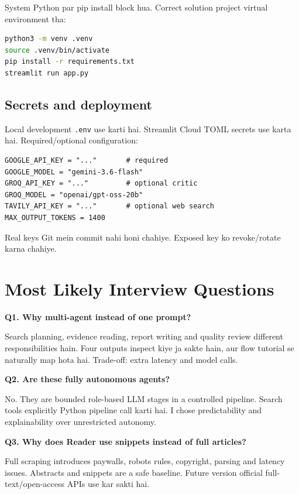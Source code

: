 \documentclass[11pt,a4paper]{article}
\newcommand{\code}[1]{\texttt{#1}}
\begin{document}
System Python par pip install block hua. Correct solution project virtual environment tha:

\begin{lstlisting}[language=bash]
python3 -m venv .venv
source .venv/bin/activate
pip install -r requirements.txt
streamlit run app.py
\end{lstlisting}

\subsection{Secrets and deployment}

Local development \code{.env} use karti hai. Streamlit Cloud TOML secrets use karta hai. Required/optional configuration:

\begin{lstlisting}
GOOGLE_API_KEY = "..."       # required
GOOGLE_MODEL = "gemini-3.6-flash"
GROQ_API_KEY = "..."         # optional critic
GROQ_MODEL = "openai/gpt-oss-20b"
TAVILY_API_KEY = "..."       # optional web search
MAX_OUTPUT_TOKENS = 1400
\end{lstlisting}

Real keys Git mein commit nahi honi chahiye. Exposed key ko revoke/rotate karna chahiye.

\section{Most Likely Interview Questions}

\textbf{Q1. Why multi-agent instead of one prompt?}
\begin{answerbox}
Search planning, evidence reading, report writing and quality review different responsibilities hain. Four outputs inspect kiye ja sakte hain, aur flow tutorial se naturally map hota hai. Trade-off: extra latency and model calls.
\end{answerbox}

\textbf{Q2. Are these fully autonomous agents?}
\begin{answerbox}
No. They are bounded role-based LLM stages in a controlled pipeline. Search tools explicitly Python pipeline call karti hai. I chose predictability and explainability over unrestricted autonomy.
\end{answerbox}

\textbf{Q3. Why does Reader use snippets instead of full articles?}
\begin{answerbox}
Full scraping introduces paywalls, robots rules, copyright, parsing and latency issues. Abstracts and snippets are a safe baseline. Future version official full-text/open-access APIs use kar sakti hai.
\end{answerbox}
\end{document}
